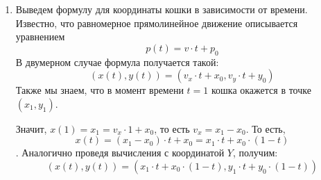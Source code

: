 \begin{enumerate}
\item Выведем формулу для координаты кошки в зависимости от времени.
Известно, что равномерное прямолинейное движение описывается уравнением
$$p(t) = v\cdot t + p_0$$
В двумерном случае формула получается такой:
$$(x(t),y(t)) = (v_x\cdot t + x_0,v_y\cdot t + y_0)$$
Также мы знаем, что в момент времени $t=1$ кошка окажется в точке $(x_1,y_1)$.

Значит, $x(1) = x_1 = v_x \cdot 1 + x_0$, то есть $v_x = x_1 - x_0$.
То есть, $$x(t) = (x_1 - x_0) \cdot t + x_0 = x_1 \cdot t + x_0 \cdot (1-t)$$.
Аналогично проведя вычисления с координатой $Y$, получим:
$$(x(t),y(t)) = (x_1 \cdot t + x_0 \cdot (1-t), y_1 \cdot t + y_0 \cdot (1-t))$$

\end{enumerate}
